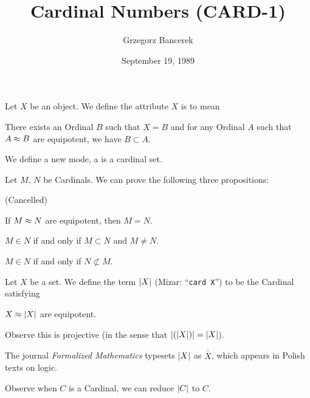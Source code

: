 \documentclass{article}
\title{Cardinal Numbers (CARD-1)}
\author{Grzegorz Bancerek}
\date{September 19, 1989}
\begin{document}
\maketitle

\begin{definition}
Let $X$ be an object.
We define the attribute $X$ is  to mean
\begin{defn}
\item There exists an Ordinal $B$ such that $X=B$ and for any Ordinal
  $A$ such that $A\approx B$ are equipotent, we have $B\subset A$.
\end{defn}
\end{definition}

\begin{definition}
We define a new mode, a  is a cardinal set.
\end{definition}

Let $M$, $N$ be Cardinals. We can prove the following three propositions:
\begin{thm}
\item\label{card1:1} (Cancelled)
\item\label{card1:2} If $M\approx N$ are equipotent, then $M=N$.
\item\label{card1:3} $M\in N$ if and only if $M\subset N$ and $M\neq N$.
\item\label{card1:4} $M\in N$ if and only if $N\nsubset M$.
\end{thm}

\begin{definition}
Let $X$ be a set.
We define the term $|X|$ (Mizar: ``\verb#card X#'') to be the
Cardinal satisfying
\begin{defn}
\item $X\approx|X|$ are equipotent.
\end{defn}
Observe this is projective (in the sense that $|(|X|)|=|X|$).
\end{definition}

\begin{remark}
The journal \textit{Formalized Mathematics} typesets $|X|$ as
$\overline{\overline{X}}$, which appears in Polish texts on logic.
\end{remark}

Observe when $C$ is a Cardinal, we can reduce $|C|$ to $C$.
\end{document}
